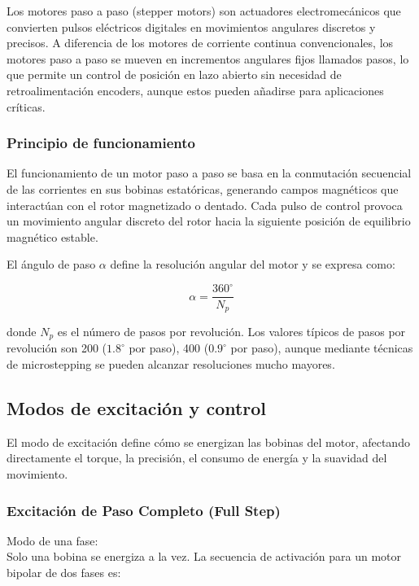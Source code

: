 
Los motores paso a paso (stepper motors) son actuadores electromecánicos que convierten pulsos eléctricos digitales en movimientos angulares discretos y precisos. A diferencia de los motores de corriente continua convencionales, los motores paso a paso se mueven en incrementos angulares fijos llamados pasos, lo que permite un control de posición en lazo abierto sin necesidad de retroalimentación encoders, aunque estos pueden añadirse para aplicaciones críticas.

\subsubsection{Principio de funcionamiento}

El funcionamiento de un motor paso a paso se basa en la conmutación secuencial de las corrientes en sus bobinas estatóricas, generando campos magnéticos que interactúan con el rotor magnetizado o dentado. Cada pulso de control provoca un movimiento angular discreto del rotor hacia la siguiente posición de equilibrio magnético estable.

El ángulo de paso $\alpha$ define la resolución angular del motor y se expresa como:

\begin{equation}
\alpha = \frac{360^\circ}{N_p}
\end{equation}

donde $N_p$ es el número de pasos por revolución. Los valores típicos de pasos por revolución son 200 ($1.8^\circ$ por paso), 400 ($0.9^\circ$ por paso), aunque mediante técnicas de microstepping se pueden alcanzar resoluciones mucho mayores.

\subsection{Modos de excitación y control}

El modo de excitación define cómo se energizan las bobinas del motor, afectando directamente el torque, la precisión, el consumo de energía y la suavidad del movimiento.

\subsubsection{Excitación de Paso Completo (Full Step)}

Modo de una fase:\\
\noindent
Solo una bobina se energiza a la vez. La secuencia de activación para un motor bipolar de dos fases es:

